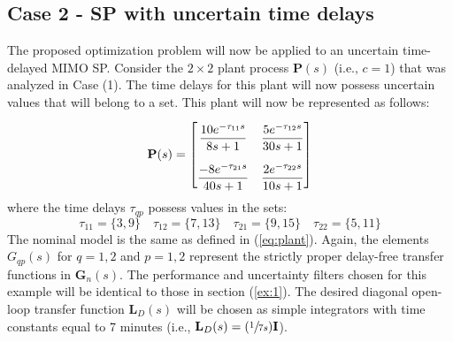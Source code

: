 \documentclass[A4, 10pt, conference]{ieeeconf}
\renewcommand{\vec}[1]{\mathbf{#1}}
\begin{document}
\subsection{Case 2 - SP with uncertain time delays} \label{ex:2}
The proposed optimization problem will now be applied to an uncertain time-delayed MIMO SP. Consider the $2 \times 2$ plant process $\mathbf{P}(s)$ ($\mbox{i.e., }c=1$) that was analyzed in Case (1). The time delays for this plant will now possess uncertain values that will belong to a set. This plant will now be represented as follows:
\begin{equation}\label{eq:uncert_plant}
\renewcommand{\arraystretch}{2.2}
\vec{P}(s)=
\begin{bmatrix}
         \dfrac{10e^{-\tau_{11}s}}{8s+1} & \dfrac{5e^{-\tau_{12}s}}{30s+1}\\[0.6em]
         \dfrac{-8e^{-\tau_{21}s}}{40s+1} & \dfrac{2e^{-\tau_{22}s}}{10s+1}
\end{bmatrix}
\end{equation}
where the time delays $\tau_{qp}$ possess values in the sets:
\begin{equation}\label{eq:mimo_un}
\tau_{11}=\{3,9\} \quad \tau_{12}=\{7,13\} \quad
\tau_{21}=\{9,15\} \quad \tau_{22}=\{5,11\}
\end{equation}
The nominal model  is the same as defined in (\ref{eq:plant}).
Again, the elements $G_{qp}(s)$ for $q=1,2$ and $p=1,2$ represent the strictly proper delay-free transfer functions in $\vec{G}_n(s)$. The performance and uncertainty filters chosen for this example will be identical to those in section (\ref{ex:1}). The desired diagonal open-loop transfer function $\vec{L}_D(s)$ will be chosen as simple integrators with time constants equal to 7 minutes (i.e., $\vec{L}_D(s)=(\sfrac{1}{7s})\vec{I}$). 
\end{document}
